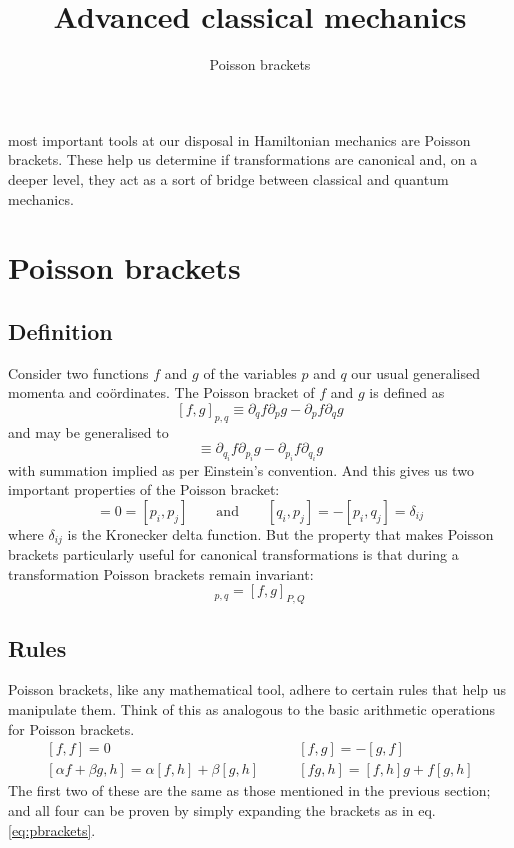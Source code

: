 \documentclass[english,seminar,headertitle]{lecture}
\title{Advanced classical mechanics}
\subtitle{Poisson brackets}
\author{}
\date{}{}{}
\begin{document}
	
 most important tools at our disposal in Hamiltonian mechanics are Poisson brackets. These help us determine if transformations are canonical and, on a deeper level, they act as a sort of bridge between classical and quantum mechanics.

\section{Poisson brackets}
\subsection{Definition}
Consider two functions $f$ and $g$ of the variables $p$ and $q$ our usual generalised momenta and co\"{o}rdinates. The Poisson bracket of $f$ and $g$ is defined as
$$
[f, g]_{p,q} \equiv \partial_q f \partial_p g - \partial_p f \partial_q g
$$
and may be generalised to
\begin{equation}
	[f, g] \equiv \partial_{q_i} f \partial_{p_i} g - \partial_{p_i} f \partial_{q_i} g \label{eq:pbrackets}
\end{equation}%
with summation implied as per Einstein's convention. And this gives us two important properties of the Poisson bracket:
\begin{equation}
	[q_i,q_j] = 0 = [p_i,p_j] \qquad\textrm{and}\qquad	[q_i,p_j] = -[p_i,q_j] = \delta_{ij} \label{eq:basic-prop}
\end{equation}%
where $\delta_{ij}$ is the Kronecker delta function. But the property that makes Poisson brackets particularly useful for canonical transformations is that during a transformation Poisson brackets remain invariant:
\begin{equation}
	[f,g]_{p,q} = [f,g]_{P,Q} \label{eq:invariance}
\end{equation}

\subsection{Rules}
Poisson brackets, like any mathematical tool, adhere to certain rules that help us manipulate them. Think of this as analogous to the basic arithmetic operations for Poisson brackets.
\begin{equation}
\begin{array}{ll}
	[f,f] = 0 \quad & \quad [f,g] = -[g,f] \\[1em]
	\left[\alpha f + \beta g, h\right] = \alpha [f, h] + \beta [g,h] \quad & \quad [fg,h] = [f,h]g + f[g,h]
\end{array} \label{eq:rules}
\end{equation}%
The first two of these are the same as those mentioned in the previous section; and all four can be proven by simply expanding the brackets as in eq. \eqref{eq:pbrackets}.
\end{document}
